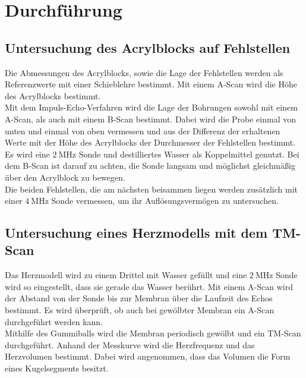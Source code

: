
\section{Durchführung}
\label{sec:Durchführung}

\subsection{Untersuchung des Acrylblocks auf Fehlstellen}

Die Abmessungen des Acrylblocks, sowie die Lage der Fehlstellen werden als Referenzwerte mit einer Schieblehre bestimmt. Mit einem A-Scan wird die Höhe des Acrylblocks bestimmt.\\
Mit dem Impuls-Echo-Verfahren wird die Lage der Bohrungen sowohl mit einem A-Scan, als auch mit einem B-Scan bestimmt. Dabei wird die Probe einmal von unten und einmal von oben vermessen und aus der Differenz der erhaltenen Werte mit der Höhe des Acrylblocks der Durchmesser der Fehlstellen bestimmt. Es wird eine $\SI{2}{\mega\hertz}$ Sonde und destilliertes Wasser als Koppelmittel genutzt. Bei dem B-Scan ist darauf zu achten, die Sonde langsam und möglichst gleichmäßig über den Acrylblock zu bewegen.\\
Die beiden Fehlstellen, die am nächsten beisammen liegen werden zusätzlich mit einer $\SI{4}{\mega\hertz}$ Sonde vermessen, um ihr Auflösungsvermögen zu untersuchen.

\subsection{Untersuchung eines Herzmodells mit dem TM-Scan}

Das Herzmodell wird zu einem Drittel mit Wasser gefüllt und eine $\SI{2}{\mega\hertz}$ Sonde wird so eingestellt, dass sie gerade das Wasser berührt. Mit einem A-Scan wird der Abstand von der Sonde bis zur Membran über die Laufzeit des Echos bestimmt. Es wird überprüft, ob auch bei gewölbter Membran ein A-Scan durchgeführt werden kann.\\  
Mithilfe des Gummiballs wird die Membran periodisch gewölbt und ein TM-Scan durchgeführt. Anhand der Messkurve wird die Herzfrequenz und das Herzvolumen bestimmt. Dabei wird angenommen, dass das Volumen die Form eines Kugelsegments besitzt.